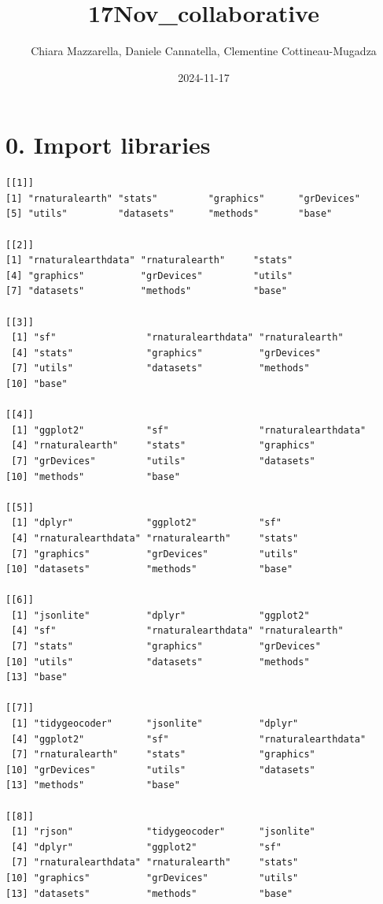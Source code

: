 \documentclass[
  letterpaper,
  DIV=11,
  numbers=noendperiod]{scrartcl}
\title{17Nov\_collaborative}
\author{Chiara Mazzarella, Daniele Cannatella, Clementine
Cottineau-Mugadza}
\date{2024-11-17}
\begin{document}
\maketitle


\section{0. Import libraries}\label{import-libraries}

\begin{verbatim}
[[1]]
[1] "rnaturalearth" "stats"         "graphics"      "grDevices"    
[5] "utils"         "datasets"      "methods"       "base"         

[[2]]
[1] "rnaturalearthdata" "rnaturalearth"     "stats"            
[4] "graphics"          "grDevices"         "utils"            
[7] "datasets"          "methods"           "base"             

[[3]]
 [1] "sf"                "rnaturalearthdata" "rnaturalearth"    
 [4] "stats"             "graphics"          "grDevices"        
 [7] "utils"             "datasets"          "methods"          
[10] "base"             

[[4]]
 [1] "ggplot2"           "sf"                "rnaturalearthdata"
 [4] "rnaturalearth"     "stats"             "graphics"         
 [7] "grDevices"         "utils"             "datasets"         
[10] "methods"           "base"             

[[5]]
 [1] "dplyr"             "ggplot2"           "sf"               
 [4] "rnaturalearthdata" "rnaturalearth"     "stats"            
 [7] "graphics"          "grDevices"         "utils"            
[10] "datasets"          "methods"           "base"             

[[6]]
 [1] "jsonlite"          "dplyr"             "ggplot2"          
 [4] "sf"                "rnaturalearthdata" "rnaturalearth"    
 [7] "stats"             "graphics"          "grDevices"        
[10] "utils"             "datasets"          "methods"          
[13] "base"             

[[7]]
 [1] "tidygeocoder"      "jsonlite"          "dplyr"            
 [4] "ggplot2"           "sf"                "rnaturalearthdata"
 [7] "rnaturalearth"     "stats"             "graphics"         
[10] "grDevices"         "utils"             "datasets"         
[13] "methods"           "base"             

[[8]]
 [1] "rjson"             "tidygeocoder"      "jsonlite"         
 [4] "dplyr"             "ggplot2"           "sf"               
 [7] "rnaturalearthdata" "rnaturalearth"     "stats"            
[10] "graphics"          "grDevices"         "utils"            
[13] "datasets"          "methods"           "base"             


\end{verbatim}
\end{document}
